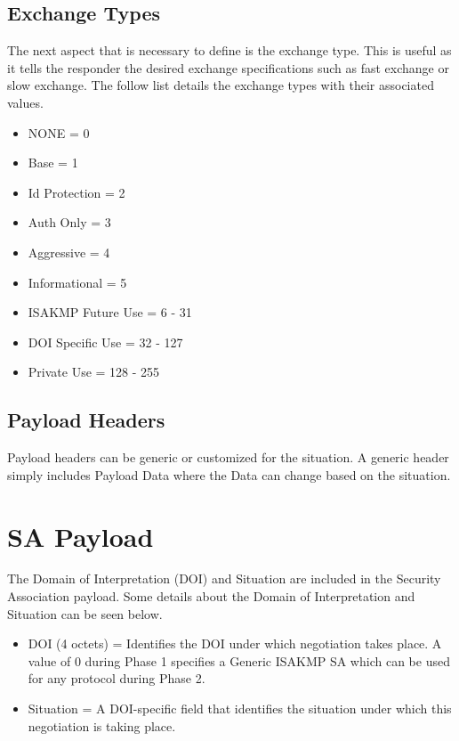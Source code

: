\documentclass{report}
\newcommand{\squash}{\itemsep=0pt\parskip=0pt}
\begin{document}
\subsection {Exchange Types}

The next aspect that is necessary to define is the exchange type. This is useful as it tells the responder the desired exchange specifications such as fast exchange or slow exchange. The follow list details the exchange types with their associated values. 

\begin{itemize}
   \squash
\item NONE = 0
\item Base = 1
\item Id Protection = 2
\item Auth Only = 3
\item Aggressive = 4
\item Informational = 5
\item ISAKMP Future Use = 6 - 31
\item DOI Specific Use = 32 - 127
\item Private Use = 128 - 255
\end{itemize}

\subsection {Payload Headers}

Payload headers can be generic or customized for the situation. A generic header simply includes Payload Data where the Data can change based on the situation. 

\section {SA Payload}

The Domain of Interpretation (DOI) and Situation are included in the Security Association payload. Some details about the Domain of Interpretation and Situation can be seen below.

\begin{itemize}
\item DOI (4 octets) = Identifies the DOI under which negotiation takes place. A value of 0 during Phase 1 specifies a Generic ISAKMP SA which can be used for any protocol during Phase 2.
\item Situation = A DOI-specific field that identifies the situation under which this negotiation is taking place. 
\end{itemize}
\end{document}
